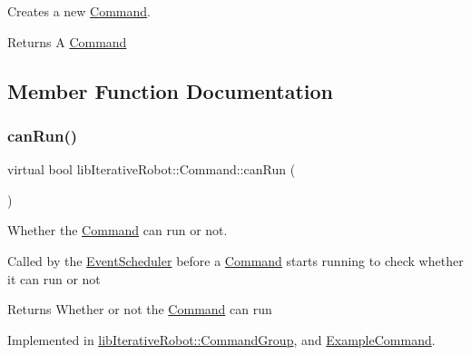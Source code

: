 Creates a new \mbox{\hyperlink{classlib_iterative_robot_1_1_command}{Command}}. 

\begin{DoxyReturn}{Returns}
A \mbox{\hyperlink{classlib_iterative_robot_1_1_command}{Command}} 
\end{DoxyReturn}


\subsection{Member Function Documentation}
\mbox{\label{classlib_iterative_robot_1_1_command_aebef0fdf029a15ee48fbb778c4265609}} 
\subsubsection{\texorpdfstring{canRun()}{canRun()}}
{\footnotesize\ttfamily virtual bool lib\+Iterative\+Robot\+::\+Command\+::can\+Run (\begin{DoxyParamCaption}{ }\end{DoxyParamCaption})\hspace{0.3cm}{\ttfamily [pure virtual]}}



Whether the \mbox{\hyperlink{classlib_iterative_robot_1_1_command}{Command}} can run or not. 

Called by the \mbox{\hyperlink{classlib_iterative_robot_1_1_event_scheduler}{Event\+Scheduler}} before a \mbox{\hyperlink{classlib_iterative_robot_1_1_command}{Command}} starts running to check whether it can run or not

\begin{DoxyReturn}{Returns}
Whether or not the \mbox{\hyperlink{classlib_iterative_robot_1_1_command}{Command}} can run 
\end{DoxyReturn}


Implemented in \mbox{\hyperlink{classlib_iterative_robot_1_1_command_group_abd75c9b52e6b4ae5af1b6724e865311f}{lib\+Iterative\+Robot\+::\+Command\+Group}}, and \mbox{\hyperlink{class_example_command_ad1df0170d99bcef6c6bc1676551f9539}{Example\+Command}}.

\mbox{\label{classlib_iterative_robot_1_1_command_a447ba6e394f165c6d358471a8bbdc76a}} 
